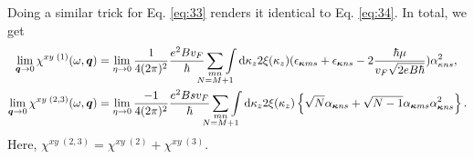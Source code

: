 Doing a similar trick for Eq. \eqref{eq:33} renders it identical to Eq. \eqref{eq:34}.
In total, we get
\begin{align}
  \lim_{\vec{q}\to 0} \chi ^{xy\; (1)} (\omega , \vec{q}) &=
                                        \lim_{\eta \to 0} \frac{1}{4(2\pi )^2}
                                        \frac{e^2 B v_F}{\hbar }
                                        \sum\limits_{\substack{mn\\ \mathclap{N=M+1}}}
                                        \int \mathrm{d}\kappa _z
  2 \xi(\kappa _z)
  (\epsilon _{\vec{\kappa}  m  s} + \epsilon _{\vec{\kappa} ns} - 2 \frac{\hbar \mu }{v_F \sqrt{2eB\hbar }})
 \alpha _{\kappa n s}^2 ,\\
  \lim_{\vec{q}\to 0} \chi ^{xy\; (2,3)} (\omega , \vec{q}) &=
                                        \lim_{\eta \to 0} \frac{-1}{4(2\pi )^2}
                                        \frac{e^2 B s v_F}{\hbar }
                                        \sum\limits_{\substack{mn\\ \mathclap{N= M+1}}}
                                        \int \mathrm{d}\kappa _z
                                        2 \xi(\kappa_z)
                                        \left\{
                                          \sqrt{N} \alpha _{\vec{\kappa } n s}
                                          +
                                          \sqrt{N-1} \alpha _{\vec{\kappa } m s} \alpha _{\vec{\kappa } ns}^2
                                        \right\}.
\end{align}
Here, \( \chi ^{xy\; (2,3)} = \chi ^{xy\; (2)} + \chi ^{xy\; (3)} \).

